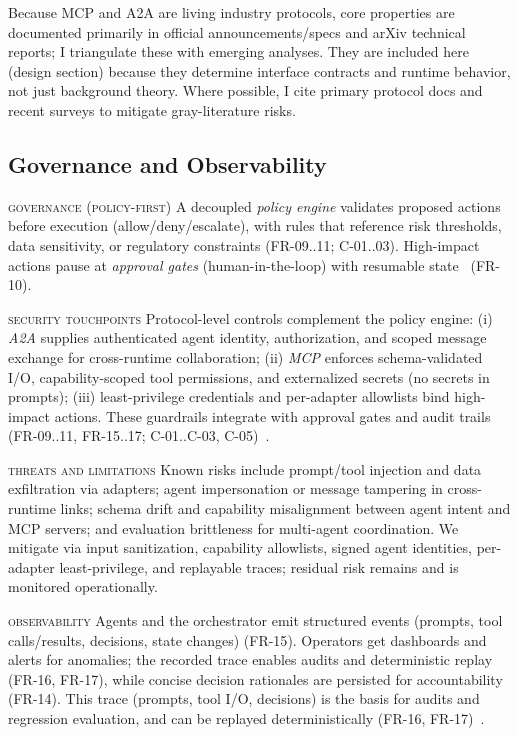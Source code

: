 Because MCP \parencite{anthropic_mcp} and A2A \parencite{google_a2a} are living industry protocols, core properties are documented primarily in official announcements/specs and arXiv technical reports; I triangulate these with emerging analyses. They are included here (design section) because they determine interface contracts and runtime behavior, not just background theory. Where possible, I cite primary protocol docs and recent surveys to mitigate gray-literature risks.

\subsection{Governance and Observability}\label{sec:gov-obs}
\textsc{governance (policy-first)} \quad A decoupled \emph{policy engine} validates proposed actions before execution (allow/deny/escalate), with rules that reference risk thresholds, data sensitivity, or regulatory constraints (\textsc{FR-09..11; C-01..03}). High-impact actions pause at \emph{approval gates} (human-in-the-loop) with resumable state\ \parencite{langgraph_hil} (\textsc{FR-10}).

\noindent \textsc{security touchpoints} \quad Protocol-level controls complement the policy engine: (i) \emph{A2A} supplies authenticated agent identity, authorization, and scoped message exchange for cross-runtime collaboration; (ii) \emph{MCP} enforces schema-validated I/O, capability-scoped tool permissions, and externalized secrets (no secrets in prompts); (iii) least-privilege credentials and per-adapter allowlists bind high-impact actions. These guardrails integrate with approval gates and audit trails (\textsc{FR-09..11, FR-15..17; C-01..C-03, C-05})~\parencite{google_a2a,anthropic_mcp}.

\noindent \textsc{threats and limitations} \quad Known risks include prompt/tool injection and data exfiltration via adapters; agent impersonation or message tampering in cross-runtime links; schema drift and capability misalignment between agent intent and MCP servers; and evaluation brittleness for multi-agent coordination. We mitigate via input sanitization, capability allowlists, signed agent identities, per-adapter least-privilege, and replayable traces; residual risk remains and is monitored operationally.

\noindent \textsc{observability} \quad Agents and the orchestrator emit structured events (prompts, tool calls/results, decisions, state changes) (\textsc{FR-15}). Operators get dashboards and alerts for anomalies; the recorded trace enables audits and deterministic replay (\textsc{FR-16, FR-17}), while concise decision rationales are persisted for accountability (\textsc{FR-14}). This trace (prompts, tool I/O, decisions) is the basis for audits and regression evaluation, and can be replayed deterministically (\textsc{FR-16, FR-17})~\parencite{langchain_multi_agents}.

